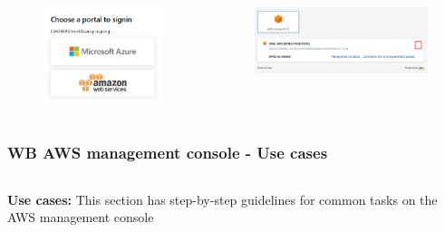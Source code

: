 \documentclass[aspectratio=169]{beamer} %
\begin{document}
\begin{frame}
\begin{columns}[c]
		\begin{figure}
			\centering
			\includegraphics[width=.5\textwidth]{./img/logon-1.png}
		\end{figure}
		\vspace{.2cm}
		\begin{figure}
			\centering
			\includegraphics[width=1\textwidth]{./img/logon-2.png}
		\end{figure}
	\end{columns}
\end{frame}

\begin{frame}
	\frametitle{WB AWS management console - Use cases}
	\begin{columns}[c]
		
		
		\textbf{Use cases:} This section has step-by-step guidelines for common tasks on the AWS management console
		
	\end{columns}
\end{frame}
\end{document}
